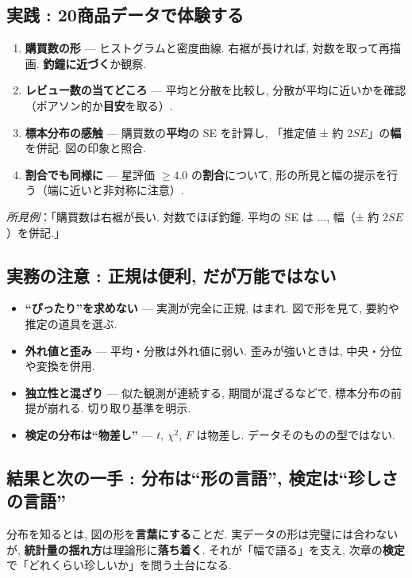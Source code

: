   \subsection{実践 : 20商品データで体験する}
    \begin{enumerate}
      \item \textbf{購買数の形} — ヒストグラムと密度曲線. 右裾が長ければ, 対数を取って再描画. \textbf{釣鐘に近づく}か観察.
      \item \textbf{レビュー数の当てどころ} — 平均と分散を比較し, 分散が平均に近いかを確認（ポアソン的か\textbf{目安}を取る）.
      \item \textbf{標本分布の感触} — 購買数の\textbf{平均}の SE を計算し, 「推定値 ± 約 $2SE$」の\textbf{幅}を併記. 図の印象と照合.
      \item \textbf{割合でも同様に} — 星評価 $\ge 4.0$ の\textbf{割合}について, 形の所見と幅の提示を行う（端に近いと非対称に注意）.
    \end{enumerate}
    \textit{所見例}：「購買数は右裾が長い. 対数でほぼ釣鐘. 平均の SE は $\ldots$, 幅（± 約 $2SE$）を併記.」

  \subsection{実務の注意 : 正規は便利, だが万能ではない}
    \begin{itemize}
      \item \textbf{“ぴったり”を求めない} — 実測が完全に正規, はまれ. 図で形を見て, 要約や推定の道具を選ぶ.
      \item \textbf{外れ値と歪み} — 平均・分散は外れ値に弱い. 歪みが強いときは, 中央・分位や変換を併用.
      \item \textbf{独立性と混ざり} — 似た観測が連続する, 期間が混ざるなどで, 標本分布の前提が崩れる. 切り取り基準を明示.
      \item \textbf{検定の分布は“物差し”} — $t$, $\chi^2$, $F$ は物差し. データそのものの型ではない.
    \end{itemize}

  \subsection{結果と次の一手 : 分布は“形の言語”, 検定は“珍しさの言語”}
    分布を知るとは, 図の形を\textbf{言葉にする}ことだ.  
    実データの形は完璧には合わないが, \textbf{統計量の揺れ方}は理論形に\textbf{落ち着く}.  
    それが「幅で語る」を支え, 次章の\textbf{検定}で「どれくらい珍しいか」を問う土台になる.

